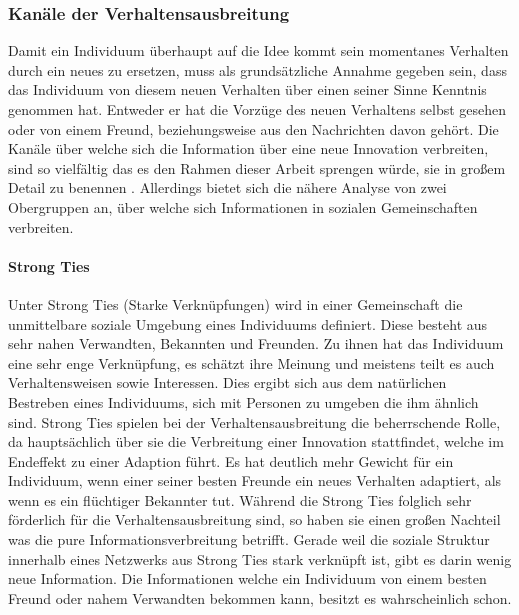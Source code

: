 \documentclass[12pt]{article}
\begin{document}
\subsubsection{Kanäle der Verhaltensausbreitung}
\label{intro_ties}
Damit ein Individuum überhaupt auf die Idee kommt sein momentanes Verhalten durch ein neues zu ersetzen, muss als grundsätzliche Annahme gegeben sein, dass das Individuum von diesem neuen Verhalten über einen seiner Sinne Kenntnis genommen hat. Entweder er hat die Vorzüge des neuen Verhaltens selbst gesehen oder von einem Freund, beziehungsweise aus den Nachrichten davon gehört. Die Kanäle über welche sich die Information über eine neue Innovation verbreiten, sind so vielfältig das es den Rahmen dieser Arbeit sprengen würde, sie in großem Detail zu benennen \cite{strang98}. Allerdings bietet sich die nähere Analyse von zwei Obergruppen an, über welche sich Informationen in sozialen Gemeinschaften verbreiten.
\paragraph{Strong Ties}
Unter Strong Ties (Starke Verknüpfungen) wird in einer Gemeinschaft die unmittelbare soziale Umgebung eines Individuums definiert. Diese besteht aus sehr nahen Verwandten, Bekannten und Freunden. Zu ihnen hat das Individuum eine sehr enge Verknüpfung, es schätzt ihre Meinung und meistens teilt es auch Verhaltensweisen sowie Interessen. Dies ergibt sich aus dem natürlichen Bestreben eines Individuums, sich mit Personen zu umgeben die ihm ähnlich sind\cite{strang98}. Strong Ties spielen bei der Verhaltensausbreitung die beherrschende Rolle, da hauptsächlich über sie die Verbreitung einer Innovation stattfindet, welche im Endeffekt zu einer Adaption führt. Es hat deutlich mehr Gewicht für ein Individuum, wenn einer seiner besten Freunde ein neues Verhalten adaptiert, als wenn es ein flüchtiger Bekannter tut. Während die Strong Ties folglich sehr förderlich für die Verhaltensausbreitung sind, so haben sie einen großen Nachteil was die pure Informationsverbreitung betrifft. Gerade weil die soziale Struktur innerhalb eines Netzwerks aus Strong Ties stark verknüpft ist, gibt es darin wenig neue Information. Die Informationen welche ein Individuum von einem besten Freund oder nahem Verwandten bekommen kann, besitzt es wahrscheinlich schon.
\end{document}
